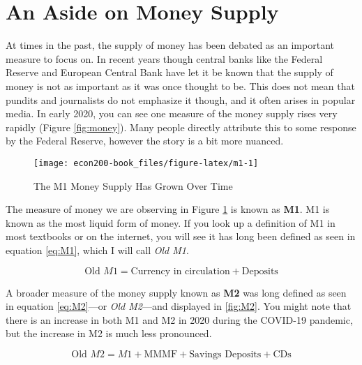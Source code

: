 \documentclass[
]{book}
\begin{document}
\hypertarget{an-aside-on-money-supply}{%
\section{An Aside on Money Supply}\label{an-aside-on-money-supply}}

At times in the past, the supply of money has been debated as an important measure to focus on. In recent years though central banks like the Federal Reserve and European Central Bank have let it be known that the supply of money is not as important as it was once thought to be. This does not mean that pundits and journalists do not emphasize it though, and it often arises in popular media. In early 2020, you can see one measure of the money supply rises very rapidly (Figure \ref{fig:money}). Many people directly attribute this to some response by the Federal Reserve, however the story is a bit more nuanced.

\begin{figure}

{\centering \texttt{[image: econ200-book\_files/figure-latex/m1-1]} 

}

\caption{The M1 Money Supply Has Grown Over Time}\label{fig:m1}
\end{figure}

The measure of money we are observing in Figure \ref{fig:m1} is known as \textbf{M1}. M1 is known as the most liquid form of money. If you look up a definition of M1 in most textbooks or on the internet, you will see it has long been defined as seen in equation \eqref{eq:M1}, which I will call \emph{Old M1}.

\begin{equation}
\text{Old } M1 = \text{Currency in circulation} + \text{Deposits} \label{eq:M1}
\end{equation}

A broader measure of the money supply known as \textbf{M2} was long defined as seen in equation \eqref{eq:M2}---or \emph{Old M2}---and displayed in \ref{fig:M2}. You might note that there is an increase in both M1 and M2 in 2020 during the COVID-19 pandemic, but the increase in M2 is much less pronounced.

\begin{equation}
\text{Old } M2 = M1 + \text{MMMF} + \text{Savings Deposits} + \text{CDs} \label{eq:M2}
\end{equation}
\end{document}
